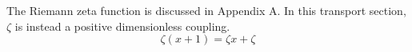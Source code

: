 \documentclass{article}
\begin{document}
The Riemann zeta function is discussed in Appendix A.  In this transport
section, $\zeta$ is instead a positive dimensionless coupling.
\begin{equation}
  \zeta(x+1)=\zeta x+\zeta
\end{equation}
\end{document}
